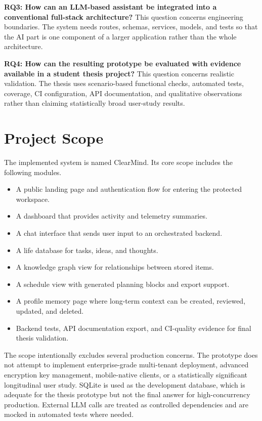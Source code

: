 \textbf{RQ3: How can an LLM-based assistant be integrated into a conventional full-stack architecture?} This question concerns engineering boundaries. The system needs routes, schemas, services, models, and tests so that the AI part is one component of a larger application rather than the whole architecture.

\textbf{RQ4: How can the resulting prototype be evaluated with evidence available in a student thesis project?} This question concerns realistic validation. The thesis uses scenario-based functional checks, automated tests, coverage, CI configuration, API documentation, and qualitative observations rather than claiming statistically broad user-study results.

\section{Project Scope}

The implemented system is named ClearMind. Its core scope includes the following modules.

\begin{itemize}
  \item A public landing page and authentication flow for entering the protected workspace.
  \item A dashboard that provides activity and telemetry summaries.
  \item A chat interface that sends user input to an orchestrated backend.
  \item A life database for tasks, ideas, and thoughts.
  \item A knowledge graph view for relationships between stored items.
  \item A schedule view with generated planning blocks and export support.
  \item A profile memory page where long-term context can be created, reviewed, updated, and deleted.
  \item Backend tests, API documentation export, and CI-quality evidence for final thesis validation.
\end{itemize}

The scope intentionally excludes several production concerns. The prototype does not attempt to implement enterprise-grade multi-tenant deployment, advanced encryption key management, mobile-native clients, or a statistically significant longitudinal user study. SQLite is used as the development database, which is adequate for the thesis prototype but not the final answer for high-concurrency production. External LLM calls are treated as controlled dependencies and are mocked in automated tests where needed.

